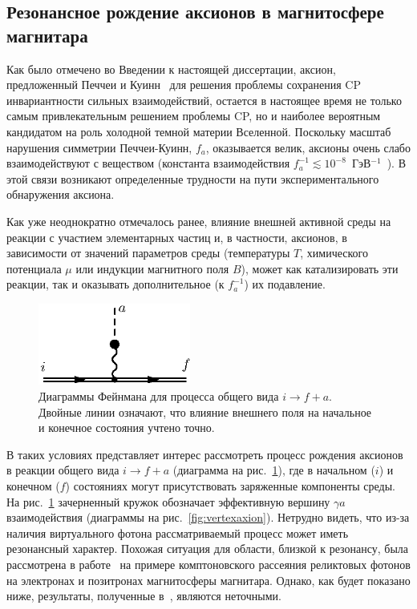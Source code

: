 \subsection{Резонансное рождение аксионов в магнитосфере магнитара}

Как было отмечено во Введении к настоящей диссертации, аксион, предложенный Печчеи  и Куинн~\cite{Quinn:1977} для 
решения проблемы сохранения CP инвариантности 
сильных взаимодействий, остается в настоящее время не только самым привлекательным 
решением проблемы CP, но и наиболее вероятным кандидатом на роль холодной темной
материи Вселенной. Поскольку масштаб нарушения симметрии Печчеи-Куинн, $f_a$,
оказывается велик, аксионы очень слабо взаимодействуют с веществом
(константа взаимодействия $f_a^{-1} \lesssim 10^{-8}$\, ГэВ$^{-1}$~\cite{Raffelt:1996}). 
В этой связи возникают определенные трудности
на пути экспериментального обнаружения аксиона.

Как уже неоднократно отмечалось ранее, влияние внешней активной среды на реакции с 
участием элементарных частиц и, в частности,  аксионов,
в зависимости от значений параметров среды (температуры  $T$, 
химического потенциала  $\mu$ или индукции магнитного поля  $B$), может
 как катализировать эти реакции, так и оказывать дополнительное (к $f_a^{-1}$) 
их подавление.  

%
\begin{figure}
\centerline{\includegraphics[width=5cm]{fig5_1.eps}}
\caption{Диаграммы Фейнмана для процесса общего вида $i \to 
f+a$. Двойные линии означают, что влияние внешнего поля на начальное и 
конечное состояния учтено точно.}
\label{fig:Diagaxion}
\end{figure}


В таких условиях представляет интерес рассмотреть процесс рождения аксионов   в 
реакции общего вида $i \to f + a$ (диаграмма на рис.~\ref{fig:Diagaxion}), 
где в начальном ($i$) и конечном ($f$) состояниях могут присутствовать 
заряженные компоненты среды. 
На рис.~\ref{fig:Diagaxion} зачерненный
кружок обозначает эффективную вершину $\gamma a$ взаимодействия
(диаграммы на рис.~\ref{fig:vertexaxion}). Нетрудно видеть, что из-за наличия виртуального 
фотона рассматриваемый процесс может иметь резонансный характер. Похожая ситуация
для области, близкой к резонансу, была рассмотрена в работе~\cite{Skobelev:2007} 
на примере
комптоновского рассеяния реликтовых фотонов на электронах и позитронах магнитосферы
магнитара. Однако, как будет показано ниже,  результаты, полученные 
в~\cite{Skobelev:2007}, являются неточными. 

